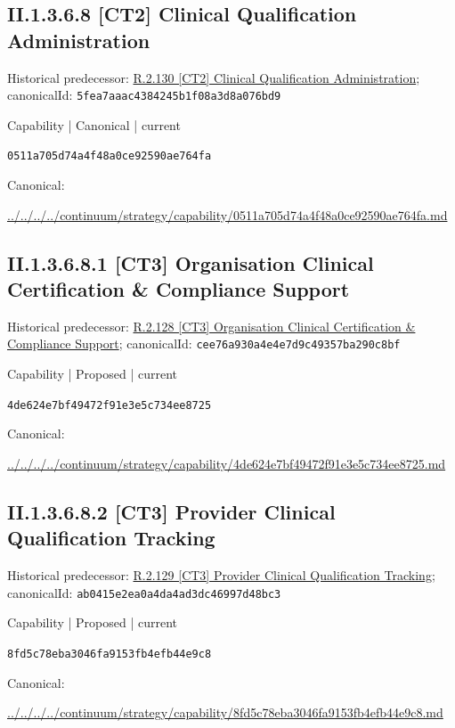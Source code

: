 \documentclass[10pt,a4paper]{article}
\begin{document}
\subsection*{II.1.3.6.8 [CT2] Clinical Qualification Administration}
Historical predecessor: \hyperref[element-5fea7aaac4384245b1f08a3d8a076bd9]{R.2.130 [CT2] Clinical Qualification Administration}; canonicalId: \texttt{5fea7aaac4384245b1f08a3d8a076bd9}\par
\label{element-0511a705d74a4f48a0ce92590ae764fa}
{\small Capability | Canonical | current}\par
\texttt{0511a705d74a4f48a0ce92590ae764fa}\par
Canonical: \par
{\footnotesize\url{../../../../continuum/strategy/capability/0511a705d74a4f48a0ce92590ae764fa.md}}\par
\subsection*{II.1.3.6.8.1 [CT3] Organisation Clinical Certification \& Compliance Support}
Historical predecessor: \hyperref[element-cee76a930a4e4e7d9c49357ba290c8bf]{R.2.128 [CT3] Organisation Clinical Certification \& Compliance Support}; canonicalId: \texttt{cee76a930a4e4e7d9c49357ba290c8bf}\par
\label{element-4de624e7bf49472f91e3e5c734ee8725}
{\small Capability | Proposed | current}\par
\texttt{4de624e7bf49472f91e3e5c734ee8725}\par
Canonical: \par
{\footnotesize\url{../../../../continuum/strategy/capability/4de624e7bf49472f91e3e5c734ee8725.md}}\par
\subsection*{II.1.3.6.8.2 [CT3] Provider Clinical Qualification Tracking}
Historical predecessor: \hyperref[element-ab0415e2ea0a4da4ad3dc46997d48bc3]{R.2.129 [CT3] Provider Clinical Qualification Tracking}; canonicalId: \texttt{ab0415e2ea0a4da4ad3dc46997d48bc3}\par
\label{element-8fd5c78eba3046fa9153fb4efb44e9c8}
{\small Capability | Proposed | current}\par
\texttt{8fd5c78eba3046fa9153fb4efb44e9c8}\par
Canonical: \par
{\footnotesize\url{../../../../continuum/strategy/capability/8fd5c78eba3046fa9153fb4efb44e9c8.md}}\par
\end{document}
